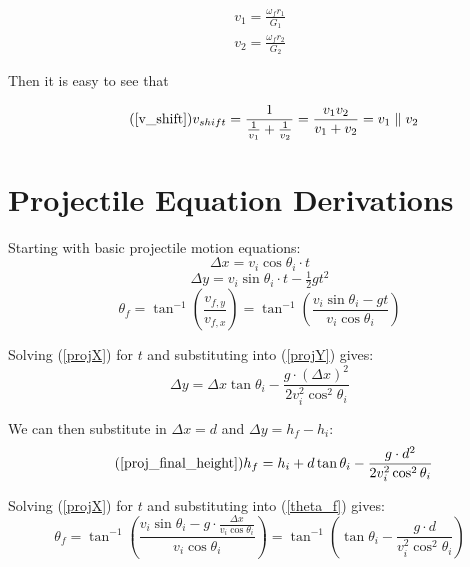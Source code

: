\documentclass[11pt,a4paper,titlepage]{article}
\begin{document}
	\begin{equation}
	\begin{split}
		v_1 = \frac{\omega_f r_1}{G_1} \\
		v_2 = \frac{\omega_f r_2}{G_2}
	\end{split}
	\end{equation}
	
	Then it is easy to see that 
	
	\begin{equation} \tag{\ref*{v_shift}}
		v_{shift} = \frac{1}{\frac{1}{v_1} + \frac{1}{v_2}} = \frac{v_1 v_2}{v_1 + v_2} = v_1 \parallel v_2
	\end{equation}
	
	\newpage
	\section{Projectile Equation Derivations} \label{projectile_appendix}
	Starting with basic projectile motion equations:
	\begin{equation} \label{projX}
		\Delta x = v_i \cos \theta_i \cdot t
	\end{equation}
	\begin{equation} \label{projY}
		\Delta y = v_i \sin \theta_i \cdot t - \tfrac{1}{2} g t^2
	\end{equation}
	\begin{equation} \label{theta_f}
		\theta_f = \tan^{-1} \left( \frac{v_{f,y}}{v_{f,x}} \right) = \tan^{-1} \left( \frac{v_i \sin \theta_i - g t}{v_i \cos \theta_i} \right)
	\end{equation}
	
	Solving (\ref{projX}) for $t$ and substituting into (\ref{projY}) gives:
	\begin{equation}
		\Delta y = \Delta x \tan \theta_i - \frac{g \cdot (\Delta x)^2}{2 v_i^2 \cos^2 \theta_i}
	\end{equation}
	
	We can then substitute in $\Delta x = d$ and $\Delta y = h_f - h_i$:
	\begin{equation} \tag{\ref*{proj_final_height}}
		h_f = h_i + d \tan \theta_i - \frac{g \cdot d^2}{2 v_i^2 \cos^2 \theta_i}
	\end{equation}
	
	Solving (\ref{projX}) for $t$ and substituting into (\ref{theta_f}) gives:
	\begin{equation} \label{theta_f_solved}
		\theta_f = \tan^{-1} \left( \frac{v_i \sin \theta_i - g \cdot \frac{\Delta x}{v_i \cos \theta_i}}{v_i \cos \theta_i} \right) = \tan^{-1} \left( \tan \theta_i - \frac{g \cdot d}{v_i^2 \cos^2 \theta_i} \right)
	\end{equation}
	
\end{document}
